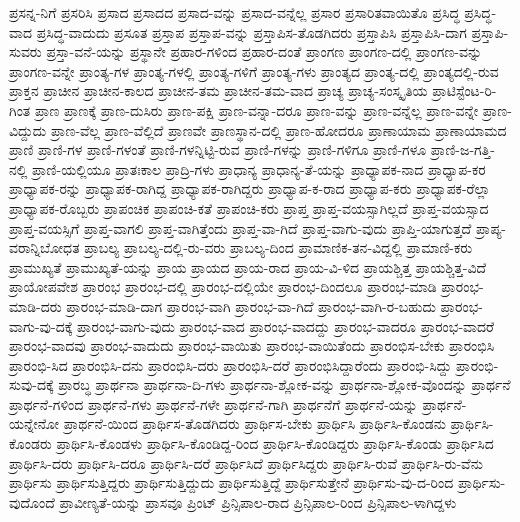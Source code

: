 {ಪ್ರಸನ್ನ-ನಿಗೆ
ಪ್ರಸರಿಸಿ
ಪ್ರಸಾದ
ಪ್ರಸಾದದ
ಪ್ರಸಾದ-ವನ್ನು
ಪ್ರಸಾದ-ವನ್ನೆಲ್ಲ
ಪ್ರಸಾರ
ಪ್ರಸಾರಿತವಾಯಿತೊ
ಪ್ರಸಿದ್ಧ
ಪ್ರಸಿದ್ಧ-ವಾದ
ಪ್ರಸಿದ್ಧ-ವಾದುದು
ಪ್ರಸೂತ
ಪ್ರಸ್ತಾಪ
ಪ್ರಸ್ತಾಪ-ವನ್ನು
ಪ್ರಸ್ತಾಪಿಸ-ತೊಡಗಿದರು
ಪ್ರಸ್ತಾಪಿಸಿ
ಪ್ರಸ್ತಾಪಿಸಿ-ದಾಗ
ಪ್ರಸ್ತಾಪಿ-ಸುವರು
ಪ್ರಸ್ತಾ-ವನೆ-ಯನ್ನು
ಪ್ರಸ್ಥಾನೇ
ಪ್ರಹಾರ-ಗಳಿಂದ
ಪ್ರಹಾರ-ದಂತೆ
ಪ್ರಾಂಗಣ
ಪ್ರಾಂಗಣ-ದಲ್ಲಿ
ಪ್ರಾಂಗಣ-ವನ್ನು
ಪ್ರಾಂಗಣ-ವನ್ನೇ
ಪ್ರಾಂತ್ಯ-ಗಳ
ಪ್ರಾಂತ್ಯ-ಗಳಲ್ಲಿ
ಪ್ರಾಂತ್ಯ-ಗಳಿಗೆ
ಪ್ರಾಂತ್ಯ-ಗಳು
ಪ್ರಾಂತ್ಯದ
ಪ್ರಾಂತ್ಯ-ದಲ್ಲಿ
ಪ್ರಾಂತ್ಯದಲ್ಲಿ-ರುವ
ಪ್ರಾಕ್ತನ
ಪ್ರಾಚೀನ
ಪ್ರಾಚೀನ-ಕಾಲದ
ಪ್ರಾಚೀನ-ತಮ
ಪ್ರಾಚೀನ-ತಮ-ವಾದ
ಪ್ರಾಚ್ಯ
ಪ್ರಾಚ್ಯ-ಸಂಸ್ಕೃತಿಯ
ಪ್ರಾಟಿಸ್ಟೆಂಟ-ರಿ-ಗಿಂತ
ಪ್ರಾಣ
ಪ್ರಾಣಕ್ಕೆ
ಪ್ರಾಣ-ದುಸಿರು
ಪ್ರಾಣ-ಪಕ್ಷಿ
ಪ್ರಾಣ-ವನ್ನಾ-ದರೂ
ಪ್ರಾಣ-ವನ್ನು
ಪ್ರಾಣ-ವನ್ನೆಲ್ಲ
ಪ್ರಾಣ-ವನ್ನೇ
ಪ್ರಾಣ-ವಿದ್ದುದು
ಪ್ರಾಣ-ವೆಲ್ಲ
ಪ್ರಾಣ-ವೆಲ್ಲಿದೆ
ಪ್ರಾಣವೇ
ಪ್ರಾಣಸ್ಥಾನ-ದಲ್ಲಿ
ಪ್ರಾಣ-ಹೋದರೂ
ಪ್ರಾಣಾಯಾಮ
ಪ್ರಾಣಾಯಾಮದ
ಪ್ರಾಣಿ
ಪ್ರಾಣಿ-ಗಳ
ಪ್ರಾಣಿ-ಗಳಂತೆ
ಪ್ರಾಣಿ-ಗಳನ್ನಿಟ್ಟಿ-ರುವ
ಪ್ರಾಣಿ-ಗಳನ್ನು
ಪ್ರಾಣಿ-ಗಳಿಗೂ
ಪ್ರಾಣಿ-ಗಳೂ
ಪ್ರಾಣಿ-ಜ-ಗತ್ತಿ-ನಲ್ಲಿ
ಪ್ರಾಣಿ-ಯಲ್ಲಿಯೂ
ಪ್ರಾತಃಕಾಲ
ಪ್ರಾದ್ರಿ-ಗಳು
ಪ್ರಾಧಾನ್ಯ
ಪ್ರಾಧಾನ್ಯ-ತೆ-ಯನ್ನು
ಪ್ರಾಧ್ಯಾಪಕ-ನಾದ
ಪ್ರಾಧ್ಯಾಪ-ಕರ
ಪ್ರಾಧ್ಯಾಪಕ-ರನ್ನು
ಪ್ರಾಧ್ಯಾಪಕ-ರಾಗಿದ್ದ
ಪ್ರಾಧ್ಯಾಪಕ-ರಾಗಿದ್ದರು
ಪ್ರಾಧ್ಯಾಪ-ಕ-ರಾದ
ಪ್ರಾಧ್ಯಾಪ-ಕರು
ಪ್ರಾಧ್ಯಾಪಕ-ರೆಲ್ಲಾ
ಪ್ರಾಧ್ಯಾಪಕ-ರೊಬ್ಬರು
ಪ್ರಾಪಂಚಿಕ
ಪ್ರಾಪಂಚಿ-ಕತೆ
ಪ್ರಾಪಂಚಿ-ಕರು
ಪ್ರಾಪ್ತ
ಪ್ರಾಪ್ತ-ವಯಸ್ಸಾಗಿಲ್ಲದೆ
ಪ್ರಾಪ್ತ-ವಯಸ್ಸಾದ
ಪ್ರಾಪ್ತ-ವಯಸ್ಸಿಗೆ
ಪ್ರಾಪ್ತ-ವಾಗಲಿ
ಪ್ರಾಪ್ತ-ವಾಗಿತ್ತೆಂದು
ಪ್ರಾಪ್ತ-ವಾ-ಗಿದೆ
ಪ್ರಾಪ್ತ-ವಾಗು-ವುದು
ಪ್ರಾಪ್ತಿ-ಯಾಗುತ್ತದೆ
ಪ್ರಾಪ್ಯ-ವರಾನ್ನಿಬೋಧತ
ಪ್ರಾಬಲ್ಯ
ಪ್ರಾಬಲ್ಯ-ದಲ್ಲಿ-ರು-ವರು
ಪ್ರಾಬಲ್ಯ-ದಿಂದ
ಪ್ರಾಮಾಣಿಕ-ತನ-ವಿದ್ದಲ್ಲಿ
ಪ್ರಾಮಾಣಿ-ಕರು
ಪ್ರಾಮುಖ್ಯತೆ
ಪ್ರಾಮುಖ್ಯತೆ-ಯನ್ನು
ಪ್ರಾಯ
ಪ್ರಾಯದ
ಪ್ರಾಯ-ರಾದ
ಪ್ರಾಯ-ವಿ-ಳಿದ
ಪ್ರಾಯಶ್ಚಿತ್ತ
ಪ್ರಾಯಶ್ಚಿತ್ತ-ವಿದೆ
ಪ್ರಾಯೋಪವೇಶ
ಪ್ರಾರಂಭ
ಪ್ರಾರಂಭ-ದಲ್ಲಿ
ಪ್ರಾರಂಭ-ದಲ್ಲಿಯೇ
ಪ್ರಾರಂಭ-ದಿಂದಲೂ
ಪ್ರಾರಂಭ-ಮಾಡಿ
ಪ್ರಾರಂಭ-ಮಾಡಿ-ದರು
ಪ್ರಾರಂಭ-ಮಾಡಿ-ದಾಗ
ಪ್ರಾರಂಭ-ವಾಗಿ
ಪ್ರಾರಂಭ-ವಾ-ಗಿದೆ
ಪ್ರಾರಂಭ-ವಾಗಿ-ರ-ಬಹುದು
ಪ್ರಾರಂಭ-ವಾಗು-ವು-ದಕ್ಕೆ
ಪ್ರಾರಂಭ-ವಾಗು-ವುದು
ಪ್ರಾರಂಭ-ವಾದ
ಪ್ರಾರಂಭ-ವಾದದ್ದು
ಪ್ರಾರಂಭ-ವಾದರೂ
ಪ್ರಾರಂಭ-ವಾದರೆ
ಪ್ರಾರಂಭ-ವಾದವು
ಪ್ರಾರಂಭ-ವಾದುದು
ಪ್ರಾರಂಭ-ವಾಯಿತು
ಪ್ರಾರಂಭ-ವಾಯಿತೆಂದು
ಪ್ರಾರಂಭಿಸ-ಬೇಕು
ಪ್ರಾರಂಭಿಸಿ
ಪ್ರಾರಂಭಿ-ಸಿದ
ಪ್ರಾರಂಭಿಸಿ-ದನು
ಪ್ರಾರಂಭಿಸಿ-ದರು
ಪ್ರಾರಂಭಿಸಿ-ದರೆ
ಪ್ರಾರಂಭಿಸಿದ್ದಾರೆಂದು
ಪ್ರಾರಂಭಿ-ಸಿದ್ದು
ಪ್ರಾರಂಭಿ-ಸುವು-ದಕ್ಕೆ
ಪ್ರಾರಬ್ಧ
ಪ್ರಾರ್ಥನಾ
ಪ್ರಾರ್ಥನಾ-ದಿ-ಗಳು
ಪ್ರಾರ್ಥನಾ-ಶ್ಲೋಕ-ವನ್ನು
ಪ್ರಾರ್ಥನಾ-ಶ್ಲೋಕ-ವೊಂದನ್ನು
ಪ್ರಾರ್ಥನೆ
ಪ್ರಾರ್ಥನೆ-ಗಳಿಂದ
ಪ್ರಾರ್ಥನೆ-ಗಳು
ಪ್ರಾರ್ಥನೆ-ಗಳೇ
ಪ್ರಾರ್ಥನೆ-ಗಾಗಿ
ಪ್ರಾರ್ಥನೆಗೆ
ಪ್ರಾರ್ಥನೆ-ಯನ್ನು
ಪ್ರಾರ್ಥನೆ-ಯನ್ನೇನೋ
ಪ್ರಾರ್ಥನೆ-ಯಿಂದ
ಪ್ರಾರ್ಥಿಸ-ತೊಡಗಿದರು
ಪ್ರಾರ್ಥಿಸ-ಬೇಕು
ಪ್ರಾರ್ಥಿಸಿ
ಪ್ರಾರ್ಥಿಸಿ-ಕೊಂಡನು
ಪ್ರಾರ್ಥಿಸಿ-ಕೊಂಡರು
ಪ್ರಾರ್ಥಿಸಿ-ಕೊಂಡಳು
ಪ್ರಾರ್ಥಿಸಿ-ಕೊಂಡಿದ್ದ-ರಿಂದ
ಪ್ರಾರ್ಥಿಸಿ-ಕೊಂಡಿದ್ದರು
ಪ್ರಾರ್ಥಿಸಿ-ಕೊಂಡು
ಪ್ರಾರ್ಥಿಸಿದ
ಪ್ರಾರ್ಥಿಸಿ-ದರು
ಪ್ರಾರ್ಥಿಸಿ-ದರೂ
ಪ್ರಾರ್ಥಿಸಿ-ದರೆ
ಪ್ರಾರ್ಥಿಸಿದೆ
ಪ್ರಾರ್ಥಿಸಿದ್ದರು
ಪ್ರಾರ್ಥಿಸಿ-ರುವೆ
ಪ್ರಾರ್ಥಿಸಿ-ರು-ವೆನು
ಪ್ರಾರ್ಥಿಸು
ಪ್ರಾರ್ಥಿಸುತ್ತಿದ್ದರು
ಪ್ರಾರ್ಥಿಸುತ್ತಿದ್ದುದು
ಪ್ರಾರ್ಥಿಸುತ್ತಿದ್ದೆ
ಪ್ರಾರ್ಥಿಸುತ್ತೇನೆ
ಪ್ರಾರ್ಥಿಸು-ವು-ದ-ರಿಂದ
ಪ್ರಾರ್ಥಿಸು-ವುದೊಂದೆ
ಪ್ರಾವೀಣ್ಯತೆ-ಯನ್ನು
ಪ್ರಾಸವೂ
ಪ್ರಿಂಟ್
ಪ್ರಿನ್ಸಿಪಾಲ-ರಾದ
ಪ್ರಿನ್ಸಿಪಾಲ-ರಿಂದ
ಪ್ರಿನ್ಸಿಪಾಲ-ಳಾಗಿದ್ದಳು
}
